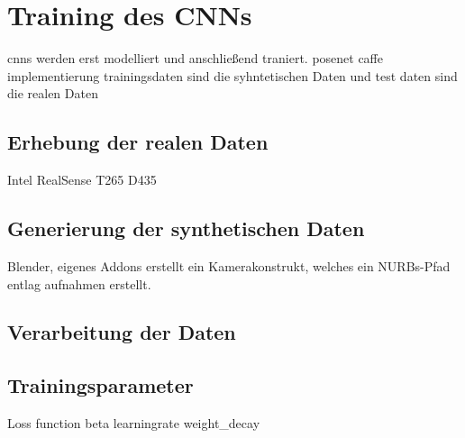
\section{Training des CNNs}
cnns werden erst modelliert und anschließend traniert.
posenet caffe implementierung
trainingsdaten sind die syhntetischen Daten und test daten sind die realen Daten


\subsection{Erhebung der realen Daten}
Intel RealSense T265 D435

\subsection{Generierung der synthetischen Daten}
Blender,
eigenes Addons erstellt ein Kamerakonstrukt, welches ein NURBs-Pfad entlag aufnahmen erstellt.

\subsection{Verarbeitung der Daten}


\subsection{Trainingsparameter}

Loss function beta
learningrate
weight_decay
